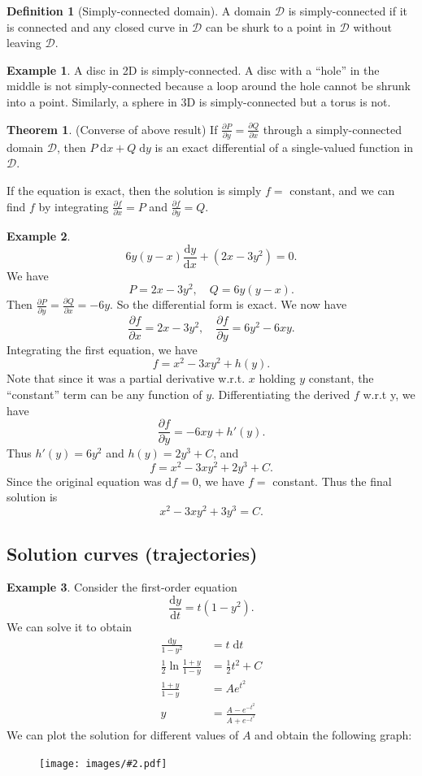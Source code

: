 \documentclass[a4paper]{article}
\theoremstyle{definition}
\newtheorem*{thm}{Theorem}
\newtheorem*{defi}{Definition}
\newtheorem*{eg}{Example}
\renewcommand{\d}{\mathrm{d}}
\newcommand{\img}[2][]{\begin{figure}[ht]\centering\texttt{[image: images/\#2.pdf]}\end{figure}}
\begin{document}
\begin{defi}[Simply-connected domain]
  A domain $\mathcal{D}$ is simply-connected if it is connected and any closed curve in $\mathcal{D}$ can be shurk to a point in $\mathcal{D}$ without leaving $\mathcal{D}$.
\end{defi}

\begin{eg}
  A disc in 2D is simply-connected. A disc with a ``hole'' in the middle is not simply-connected because a loop around the hole cannot be shrunk into a point. Similarly, a sphere in 3D is simply-connected but a torus is not. 
\end{eg}

\begin{thm}
  (Converse of above result) If $\frac{\partial P}{\partial y} = \frac{\partial Q}{\partial x}$ through a simply-connected domain $\mathcal{D}$, then $P\;\d x + Q\; \d y$ is an exact differential of a single-valued function in $\mathcal{D}$.
\end{thm}
If the equation is exact, then the solution is simply $f = $ constant, and we can find $f$ by integrating $\frac{\partial f}{\partial x} = P$ and $\frac{\partial f}{\partial y} = Q$.

\begin{eg}
  \[
  6y(y - x)\frac{\d y}{\d x} + (2x - 3y^2) = 0.
  \]
  We have
  \[
  P = 2x - 3y^2, \quad Q = 6y(y - x).
  \]
  Then $\frac{\partial P}{\partial y} = \frac{\partial Q}{\partial x} = -6y$. So the differential form is exact. We now have
  \[
  \frac{\partial f}{\partial x} = 2x - 3y^2, \quad \frac{\partial f}{\partial y} = 6y^2 - 6xy.
  \]
  Integrating the first equation, we have
  \[
  f = x^2 - 3xy^2 + h(y).
  \]
  Note that since it was a partial derivative w.r.t. $x$ holding $y$ constant, the ``constant'' term can be any function of $y$. Differentiating the derived $f$ w.r.t y, we have
  \[
  \frac{\partial f}{\partial y} = -6xy + h'(y).
  \]
  Thus $h'(y) = 6y^2$ and $h(y) = 2y^3 + C$, and 
  \[
  f = x^2 - 3xy^2 + 2y^3 + C.
  \]
  Since the original equation was $\d f = 0$, we have $f = $ constant. Thus the final solution is
  \[
  x^2 - 3xy^2 + 3y^3 = C.
  \]
\end{eg}

\subsection{Solution curves (trajectories)}
\begin{eg}
  Consider the first-order equation
  \[
  \frac{\d y}{\d t} = t(1 - y^2).
  \]
  We can solve it to obtain 
  \begin{align*}
    \frac{\d y}{1 - y^2} &= t\; \d t\\
    \frac{1}{2}\ln\frac{1 + y}{1 - y} &= \frac{1}{2}t^2 + C\\
    \frac{1 + y}{1 - y} &= Ae^{t^2}\\
    y &= \frac{A - e^{-t^2}}{A + e^{-t^2}}
  \end{align*}
  We can plot the solution for different values of $A$ and obtain the following graph:
\img{de_5}
\end{eg}
\end{document}
